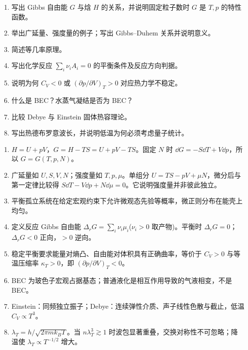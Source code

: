 
\begin{question}[40 分]
\begin{enumerate}
\item 写出 Gibbs 自由能 $G$ 与焓 $H$ 的关系，并说明固定粒子数时 $G$ 是 $T,p$ 的特性函数。
\item 举出广延量、强度量的例子；写出 Gibbs--Duhem 关系并说明意义。
\item 简述等几率原理。
\item 写出化学反应 $\sum_i\nu_iA_i=0$ 的平衡条件及反应方向判据。
\item 说明为何 $C_V<0$ 或 $(\partial p/\partial V)_T>0$ 对应热力学不稳定。
\item 什么是 BEC？水蒸气凝结是否为 BEC？
\item 比较 Debye 与 Einstein 固体热容理论。
\item 写出热德布罗意波长，并说明低温为何必须考虑量子统计。
\end{enumerate}
\begin{solution}
\begin{enumerate}
\item $H=U+pV$，$G=H-TS=U+pV-TS$。固定 $N$ 时 $\dd{G}=-S\dd{T}+V\dd{p}$，所以 $G=G(T,p,N)$。
\item 广延量如 $U,S,V,N$；强度量如 $T,p,\mu$。单组分 $U=TS-pV+\mu N$，微分后与第一定律比较得 $S\dd{T}-V\dd{p}+N\dd{\mu}=0$。它说明强度量并非彼此独立。
\item 平衡孤立系统在给定宏观约束下允许微观态先验等概率，微正则分布在能壳上均匀。
\item 定义反应 Gibbs 自由能 $\Delta_rG=\sum_i\nu_i\mu_i$($\nu_i>0$ 取产物)。平衡时 $\Delta_rG=0$；$\Delta_rG<0$ 正向，$>0$ 逆向。
\item 稳定平衡要求能量对熵凸、自由能对体积具有正确曲率，等价于 $C_V>0$ 与等温压缩率 $\kappa_T>0$，即 $(\partial p/\partial V)_T<0$。
\item BEC 为玻色子宏观占据基态；普通液化是相互作用导致的气液相变，不是 BEC。
\item Einstein：同频独立振子；Debye：连续弹性介质、声子线性色散与截止，低温 $C_V\propto T^3$。
\item $\lambda_T=h/\sqrt{2\pi mk_BT}$。当 $n\lambda_T^3\gtrsim1$ 时波包显著重叠，交换对称性不可忽略；降温使 $\lambda_T\propto T^{-1/2}$ 增大。
\end{enumerate}
\end{solution}
\end{question}

